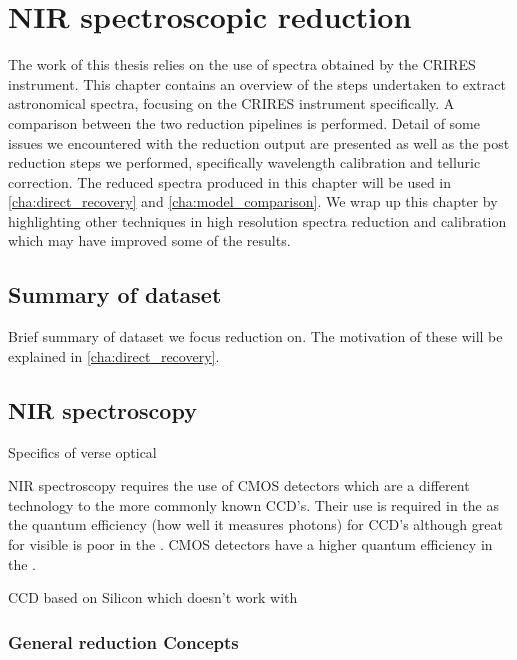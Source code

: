 
\chapter{NIR spectroscopic reduction} %
\label{cha:reduction} 
The work of this thesis relies on the use of {\nir} spectra obtained by the CRIRES instrument. This chapter contains an overview of the steps undertaken to extract astronomical spectra, focusing on the CRIRES instrument specifically. A comparison between the two reduction pipelines is performed. Detail of some issues we encountered with the reduction output are presented as well as the post reduction steps we performed, specifically wavelength calibration and telluric correction. The reduced spectra produced in this chapter will be used in \cref{cha:direct_recovery} and \cref{cha:model_comparison}. We wrap up this chapter by highlighting other techniques in high resolution {\nir} spectra reduction and calibration which may have improved some of the results.  

\section{Summary of dataset}
\todo{}{}
Brief summary of dataset we focus reduction on. The motivation of these will be explained in \cref{cha:direct_recovery}.

 
\section{NIR spectroscopy}
\todo{}{}
Specifics of {\nir} verse optical

NIR spectroscopy requires the use of CMOS detectors which are a different technology to the more commonly known CCD's. Their use is required in the {\nir} as the quantum efficiency (how well it measures photons) for CCD's although great for visible is poor in the \nir. CMOS detectors have a higher quantum efficiency in the \nir. 

CCD based on Silicon which doesn't work with \nir


\subsection{General reduction Concepts}
\label{subsec:nirreduction}

